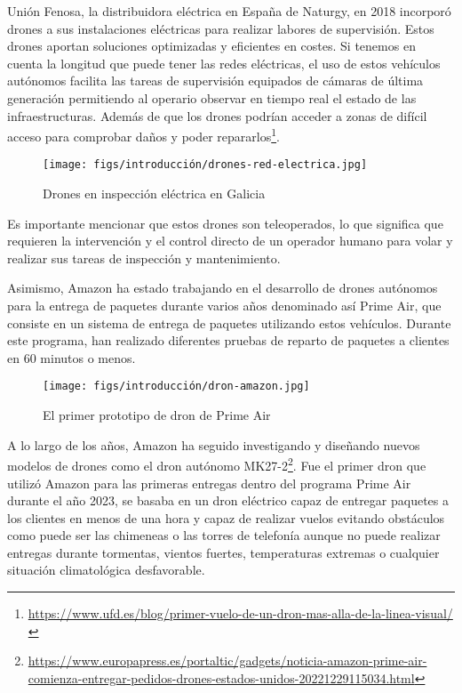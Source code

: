 Unión Fenosa, la distribuidora eléctrica en España de Naturgy, en 2018 incorporó drones a sus instalaciones eléctricas para realizar labores de supervisión. Estos drones aportan 
soluciones optimizadas y eficientes en costes. Si tenemos en cuenta la longitud que puede tener las redes eléctricas, el uso de estos vehículos
autónomos facilita las tareas de supervisión equipados de cámaras de última generación permitiendo al operario observar en tiempo real el estado de las infraestructuras. Además de que los
drones podrían acceder a zonas de difícil acceso para comprobar daños y poder repararlos\footnote{\url{https://www.ufd.es/blog/primer-vuelo-de-un-dron-mas-alla-de-la-linea-visual/}}.  

\begin{figure} [H]
  \begin{center}
    \texttt{[image: figs/introducción/drones-red-electrica.jpg]}
  \end{center}
  \caption{Drones en inspección eléctrica en Galicia}
  \label{fig:Fenosa}
  \vspace{-1.5em}
\end{figure}

Es importante mencionar que estos drones son teleoperados, lo que significa que requieren la intervención y el control directo de un operador humano para volar y realizar sus tareas 
de inspección y mantenimiento.

Asimismo, Amazon ha estado trabajando en el desarrollo de drones autónomos para la entrega de paquetes durante varios años denominado así Prime Air\cite{AmazonPrimeAir}, 
que consiste en un sistema de entrega de paquetes utilizando estos vehículos. Durante este programa, han realizado diferentes pruebas de reparto de paquetes a clientes
en 60 minutos o menos. 

\begin{figure} [H]
  \begin{center}
    \texttt{[image: figs/introducción/dron-amazon.jpg]}
  \end{center}
  \caption{El primer prototipo de dron de Prime Air}
  \label{fig:PrimerPrimeAir}
  \vspace{-1.5em}
\end{figure}

A lo largo de los años, Amazon ha seguido investigando y diseñando nuevos modelos de drones como el dron autónomo MK27-2\footnote{\url{https://www.europapress.es/portaltic/gadgets/noticia-amazon-prime-air-comienza-entregar-pedidos-drones-estados-unidos-20221229115034.html}}. Fue el primer 
dron que utilizó Amazon para 
las primeras entregas dentro del programa Prime Air durante el año 2023, se basaba en un dron eléctrico capaz de entregar paquetes a los clientes en menos de una
hora y capaz de realizar vuelos evitando obstáculos como puede ser las chimeneas o las torres de telefonía aunque no puede realizar entregas durante tormentas, vientos fuertes, temperaturas
extremas o cualquier situación climatológica desfavorable. 

